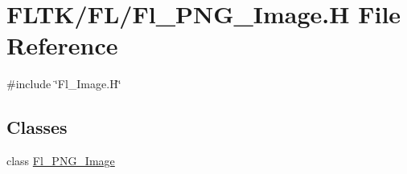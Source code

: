 \hypertarget{_fl___p_n_g___image_8_h}{}\section{F\+L\+T\+K/\+F\+L/\+Fl\+\_\+\+P\+N\+G\+\_\+\+Image.H File Reference}
\label{_fl___p_n_g___image_8_h}
{\ttfamily \#include \char`\"{}Fl\+\_\+\+Image.\+H\char`\"{}}\newline
\subsection*{Classes}
\begin{DoxyCompactItemize}
\item 
class \hyperlink{class_fl___p_n_g___image}{Fl\+\_\+\+P\+N\+G\+\_\+\+Image}
\end{DoxyCompactItemize}
